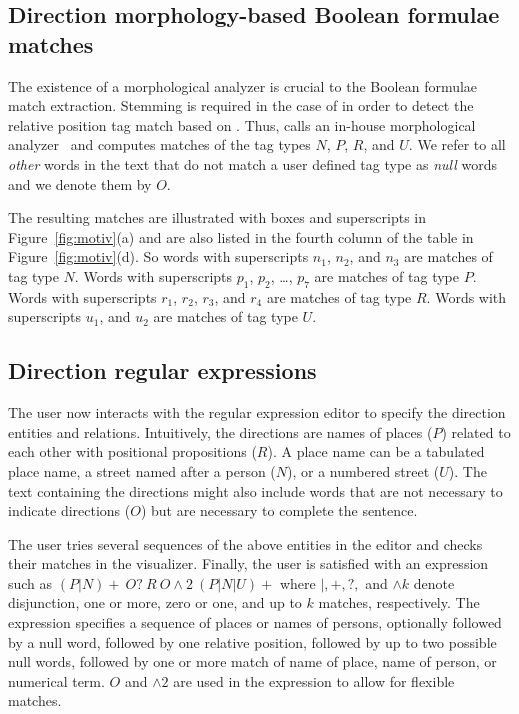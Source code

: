 \begin{appendices}
\subsection*{Direction morphology-based Boolean formulae matches}

The existence of a morphological analyzer is crucial 
to the Boolean formulae match extraction. 
Stemming is required in the case of  in order to detect 
the relative position tag match  based on . 
Thus, \framework calls an in-house morphological 
analyzer~\cite{ZaMaColing2012DemosSarf} and computes matches of 
the tag types $N$, $P$, $R$, and $U$. 
We refer to all {\em other} words in the text that do not match 
a user defined tag type as {\em null} words and we denote them by $O$. 

The resulting matches are illustrated with boxes and superscripts 
in Figure~\ref{fig:motiv}(a) and are also listed in 
the fourth column of the table in Figure~\ref{fig:motiv}(d). 
So words with superscripts $n_1$, $n_2$, and $n_3$ are matches of tag type $N$. 
Words with superscripts $p_1$, $p_2$, \dots, $p_7$ are matches of tag type $P$. 
Words with superscripts $r_1$, $r_2$, $r_3$, and $r_4$ are matches of tag type $R$. 
Words with superscripts $u_1$, and $u_2$ are matches of tag type $U$.

\subsection*{Direction regular expressions}

The user now interacts with the regular expression editor to 
specify the direction entities and relations.
Intuitively, 
the directions are names of places ($P$) related to each other with 
positional propositions ($R$). 
A place name can be a tabulated place name, a street named after 
a person ($N$), or a numbered street ($U$). 
The text containing the directions might also include words that are not 
necessary to indicate directions ($O$)
but are necessary to complete the sentence. 

The user tries several sequences of the above entities in the 
editor and checks their matches in the visualizer. 
Finally, the user is satisfied with an expression such as 
$(P|N)+~O?~R~O\wedge 2~(P|N|U)+$ where 
$|,+,?,$ and $\wedge k$ denote disjunction, one or more, zero or one, and
up to $k$ matches, respectively. 
The expression specifies a sequence of places or names of persons, 
optionally followed by a null word, 
followed by one relative position, followed by up to two possible null words, 
followed by one or more match of name of place, name of person, or numerical term. 
$O$ and $\wedge 2$ are used in the expression to allow for flexible matches. 


\end{appendices}
